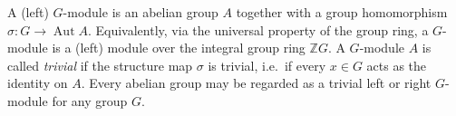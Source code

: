 A (left) $G$-module is an abelian group $A$ together with a group homomorphism $\sigma: G \to \operatorname{Aut} A$. Equivalently, via the universal property of the group ring, a $G$-module is a (left) module over the integral group ring $\mathbb{Z}G$. A $G$-module $A$ is called \emph{trivial} if the structure map $\sigma$ is trivial, i.e.\ if every $x \in G$ acts as the identity on $A$. Every abelian group may be regarded as a trivial left or right $G$-module for any group $G$.
